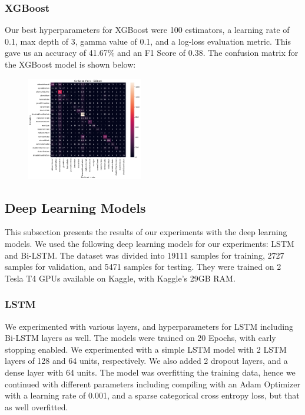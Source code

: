 \subsubsection{XGBoost}
Our best hyperparameters for XGBoost were 100 estimators, a learning rate of 0.1, max depth of 3, gamma value of 0.1, and a log-loss evaluation metric. This gave us an accuracy of 41.67\% and an F1 Score of 0.38. The confusion matrix for the XGBoost model is shown below:
\begin{figure}[H]
    \centering
    \includegraphics[width=0.45\textwidth]{xgboost_confmat.png}
\end{figure}

\subsection{Deep Learning Models}

This subsection presents the results of our experiments with the deep learning models. We used the following deep learning models for our experiments: LSTM and Bi-LSTM. The dataset was divided into 19111 samples for training, 2727 samples for validation, and 5471 samples for testing. They were trained on 2 Tesla T4 GPUs available on Kaggle, with Kaggle's 29GB RAM. 

\subsubsection{LSTM}
We experimented with various layers, and hyperparameters for LSTM including Bi-LSTM layers as well. The models were trained on 20 Epochs, with early stopping enabled. We experimented with a simple LSTM model with 2 LSTM layers of 128 and 64 units, respectively. We also added 2 dropout layers, and a dense layer with 64 units. The model was overfitting the training data, hence we continued with different parameters including compiling with an Adam Optimizer with a learning rate of 0.001, and a sparse categorical cross entropy loss, but that as well overfitted. 

